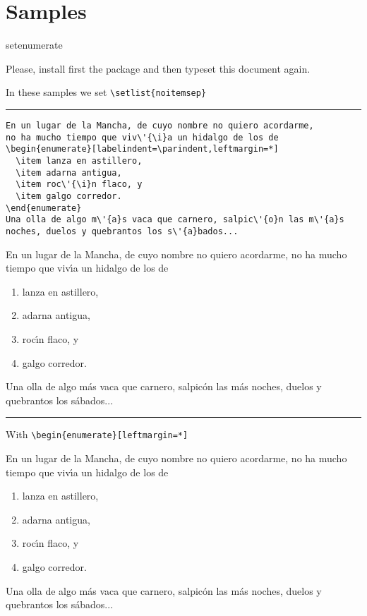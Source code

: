 \documentclass{article}
\begin{document}
\section{Samples}

\expandafter\ifx\csname setenumerate\endcsname\relax

Please, install first the package and then typeset this
document again.

\else

In these samples we set \verb|\setlist{noitemsep}|

\small

\vskip6pt
\goodbreak
\hrule
\vskip6pt

\begin{verbatim}
En un lugar de la Mancha, de cuyo nombre no quiero acordarme,
no ha mucho tiempo que viv\'{\i}a un hidalgo de los de
\begin{enumerate}[labelindent=\parindent,leftmargin=*]
  \item lanza en astillero,
  \item adarna antigua,
  \item roc\'{\i}n flaco, y
  \item galgo corredor.
\end{enumerate}
Una olla de algo m\'{a}s vaca que carnero, salpic\'{o}n las m\'{a}s
noches, duelos y quebrantos los s\'{a}bados...
\end{verbatim}

En un lugar de la Mancha, de cuyo nombre no quiero acordarme,
no ha mucho tiempo que viv\'{\i}a un hidalgo de los de
\begin{enumerate}[labelindent=\parindent,leftmargin=*]
\item lanza en astillero,
\item adarna antigua,
\item roc\'{\i}n flaco, y
\item galgo corredor.
\end{enumerate}
Una olla de algo m\'{a}s vaca que carnero, salpic\'{o}n las m\'{a}s
noches, duelos y quebrantos los s\'{a}bados...


\vskip6pt
\goodbreak
\hrule
\vskip6pt

With \verb|\begin{enumerate}[leftmargin=*]|

En un lugar de la Mancha, de cuyo nombre no quiero acordarme,
no ha mucho tiempo que viv\'{\i}a un hidalgo de los de
\begin{enumerate}[leftmargin=*]
\item lanza en astillero,
\item adarna antigua,
\item roc\'{\i}n flaco, y
\item galgo corredor.
\end{enumerate}
Una olla de algo m\'{a}s vaca que carnero, salpic\'{o}n las m\'{a}s
noches, duelos y quebrantos los s\'{a}bados...
\end{document}
